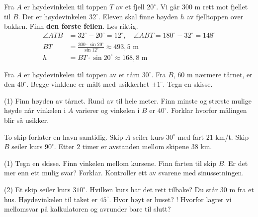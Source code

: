 Fra $A$ er høydevinkelen til toppen $T$ av et fjell $20^\circ$. Vi går $300$ m rett mot fjellet til $B$. Der er høydevinkelen $32^\circ$. Eleven skal finne høyden $h$ av fjelltoppen over bakken. Finn \textbf{den første feilen}. Løs riktig.
\[ \begin{aligned}
\angle ATB &= 32^\circ - 20^\circ = 12^\circ, \quad \angle ABT = 180^\circ - 32^\circ = 148^\circ\\
BT &= \frac{300 \cdot \sin 20^\circ}{\sin 12^\circ} \approx 493,5 \text{ m}\\
h &= BT \cdot \sin 20^\circ \approx 168,8 \text{ m}
\end{aligned} \]


Fra $A$ er høydevinkelen til toppen av et tårn $30^\circ$. Fra $B$, $60$ m nærmere tårnet, er den $40^\circ$. Begge vinklene er målt med usikkerhet $\pm 1^\circ$. Tegn en skisse.
\begin{tasks}(1)
  \task Finn høyden av tårnet. Rund av til hele meter.
  \task Finn minste og største mulige høyde når vinkelen i $A$ varierer og vinkelen i $B$ er $40^\circ$.
  \task Forklar hvorfor målingen blir så usikker.
\end{tasks}

To skip forlater en havn samtidig. Skip $A$ seiler kurs $30^\circ$ med fart $21$ km/t. Skip $B$ seiler kurs $90^\circ$. Etter $2$ timer er avstanden mellom skipene $38$ km.
\begin{tasks}(1)
  \task Tegn en skisse. Finn vinkelen mellom kursene.
  \task Finn farten til skip $B$. Er det mer enn ett mulig svar? Forklar.
  \task Kontroller ett av svarene med sinussetningen.
\end{tasks}

\begin{sjekk}
\begin{tasks}(2)
  \task Et skip seiler kurs $310^\circ$. Hvilken kurs har det rett tilbake?
  \task Du står $30$ m fra et hus. Høydevinkelen til taket er $45^\circ$. Hvor høyt er huset?
  \task! Hvorfor lagrer vi mellomsvar på kalkulatoren og avrunder bare til slutt?
\end{tasks}
\end{sjekk}

